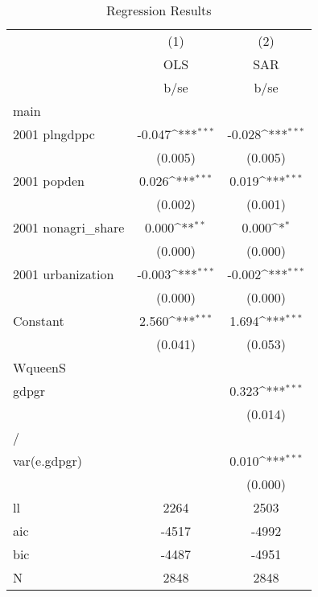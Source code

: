 \begin{table}[htbp]\centering
\def\sym#1{\ifmmode^{#1}\else\(^{#1}\)\fi}
\caption{Regression Results}
\begin{tabular}{l*{2}{c}}
\hline\hline
                    &\multicolumn{1}{c}{(1)}&\multicolumn{1}{c}{(2)}\\
                    &\multicolumn{1}{c}{OLS}&\multicolumn{1}{c}{SAR}\\
                    &        b/se         &        b/se         \\
\hline
main                &                     &                     \\
2001 plngdppc       &      -0.047\sym{***}&      -0.028\sym{***}\\
                    &     (0.005)         &     (0.005)         \\
2001 popden         &       0.026\sym{***}&       0.019\sym{***}\\
                    &     (0.002)         &     (0.001)         \\
2001 nonagri\_share  &       0.000\sym{**} &       0.000\sym{*}  \\
                    &     (0.000)         &     (0.000)         \\
2001 urbanization   &      -0.003\sym{***}&      -0.002\sym{***}\\
                    &     (0.000)         &     (0.000)         \\
Constant            &       2.560\sym{***}&       1.694\sym{***}\\
                    &     (0.041)         &     (0.053)         \\
\hline
WqueenS             &                     &                     \\
gdpgr               &                     &       0.323\sym{***}\\
                    &                     &     (0.014)         \\
\hline
/                   &                     &                     \\
var(e.gdpgr)        &                     &       0.010\sym{***}\\
                    &                     &     (0.000)         \\
\hline
ll                  &        2264         &        2503         \\
aic                 &       -4517         &       -4992         \\
bic                 &       -4487         &       -4951         \\
N                   &        2848         &        2848         \\
\hline\hline
\end{tabular}
\end{table}
